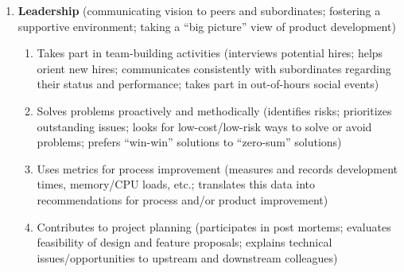 \documentclass{report}
\begin{document}
\begin{enumerate}
\begin{enumerate}
  \end{enumerate}

\item \textbf{Leadership} (communicating vision to peers and
subordinates; fostering a supportive environment; taking a ``big
picture'' view of product development)

  \begin{enumerate}

  \item Takes part in team-building activities (interviews potential
  hires; helps orient new hires; communicates consistently with
  subordinates regarding their status and performance; takes part in
  out-of-hours social events)

  \item Solves problems proactively and methodically (identifies
  risks; prioritizes outstanding issues; looks for low-cost/low-risk
  ways to solve or avoid problems; prefers ``win-win'' solutions to
  ``zero-sum'' solutions)

  \item Uses metrics for process improvement (measures and records
  development times, memory/CPU loads, etc.; translates this data into
  recommendations for process and/or product improvement)

  \item Contributes to project planning (participates in post mortems;
  evaluates feasibility of design and feature proposals; explains
  technical issues/opportunities to upstream and downstream
  colleagues)

  \end{enumerate}

\end{enumerate}

\end{document}

